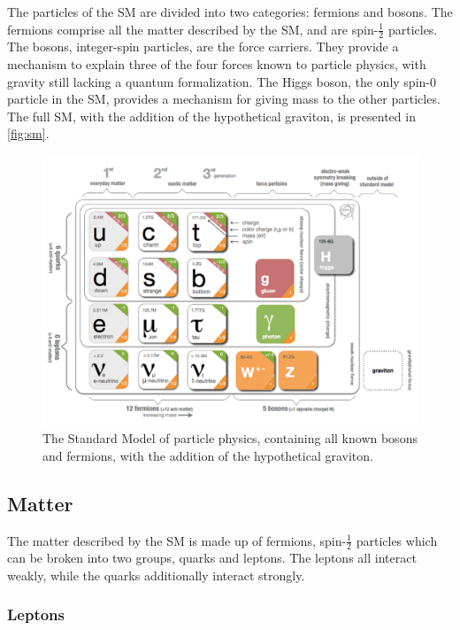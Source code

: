 The particles of the \ac{SM} are divided into two categories: fermions and bosons. The fermions comprise all the matter described by the \ac{SM}, and are spin-$\frac{1}{2}$ particles. The bosons, integer-spin particles, are the force carriers. They provide a mechanism to explain three of the four forces known to particle physics, with gravity still lacking a quantum formalization. The Higgs boson, the only spin-0 particle in the \ac{SM}, provides a mechanism for giving mass to the other particles. The full \ac{SM}, with the addition of the hypothetical graviton, is presented in \autoref{fig:sm}. 

\begin{centering}
\begin{figure}[bth]
\myfloatalign
\includegraphics[width=.85\linewidth]{figures/theory/standardmodel.png}
\caption{The Standard Model of particle physics, containing all known bosons and fermions, with the addition of the hypothetical graviton. \cite{Galbraith:2012}}
\label{fig:sm}
\end{figure}
\end{centering}

\subsection{Matter}
\label{sec:matter}

The matter described by the \ac{SM} is made up of fermions, spin-$\frac{1}{2}$ particles which can be broken into two groups, quarks and leptons. The leptons all interact weakly, while the quarks additionally interact strongly. 

\subsubsection{Leptons}


